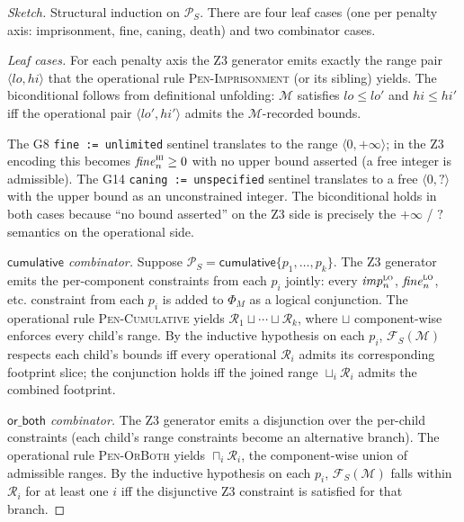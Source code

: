 \begin{proof}[Sketch]
Structural induction on $\mathcal{P}_S$. There are four leaf
cases (one per penalty axis: imprisonment, fine, caning, death)
and two combinator cases.

\textit{Leaf cases.} For each penalty axis the Z3 generator
emits exactly the range pair $\langle \mathit{lo},
\mathit{hi} \rangle$ that the operational rule
\textsc{Pen-Imprisonment} (or its sibling) yields. The
biconditional follows from definitional unfolding: $\mathcal{M}$
satisfies $\mathit{lo} \le \mathit{lo}'$ and
$\mathit{hi} \le \mathit{hi}'$ iff the operational pair
$\langle \mathit{lo}', \mathit{hi}' \rangle$ admits the
$\mathcal{M}$-recorded bounds.

The G8 \texttt{fine := unlimited} sentinel translates to the
range $\langle 0, +\infty \rangle$; in the Z3 encoding this
becomes $\mathit{fine}^{\textsc{hi}}_n \ge 0$ with no upper
bound asserted (a free integer is admissible). The G14
\texttt{caning := unspecified} sentinel translates to a free
$\langle 0, ? \rangle$ with the upper bound as an unconstrained
integer. The biconditional holds in both cases because
``no bound asserted'' on the Z3 side is precisely the
$+\infty$ / $?$ semantics on the operational side.

\textit{$\textsf{cumulative}$ combinator.} Suppose
$\mathcal{P}_S = \textsf{cumulative}\{p_1, \ldots, p_k\}$.
The Z3 generator emits the per-component constraints from each
$p_i$ jointly: every $\mathit{imp}^{\textsc{lo}}_n$,
$\mathit{fine}^{\textsc{lo}}_n$, etc. constraint from each
$p_i$ is added to $\Phi_M$ as a logical conjunction. The
operational rule \textsc{Pen-Cumulative} yields
$\mathcal{R}_1 \sqcup \cdots \sqcup \mathcal{R}_k$, where
$\sqcup$ component-wise enforces every child's range. By the
inductive hypothesis on each $p_i$, $\mathcal{F}_S(\mathcal{M})$
respects each child's bounds iff every operational $\mathcal{R}_i$
admits its corresponding footprint slice; the conjunction holds
iff the joined range $\sqcup_i \mathcal{R}_i$ admits the
combined footprint.

\textit{$\textsf{or\_both}$ combinator.} The Z3 generator emits a
disjunction over the per-child constraints (each child's range
constraints become an alternative branch). The operational rule
\textsc{Pen-OrBoth} yields $\sqcap_i \mathcal{R}_i$, the
component-wise union of admissible ranges. By the inductive
hypothesis on each $p_i$, $\mathcal{F}_S(\mathcal{M})$ falls
within $\mathcal{R}_i$ for at least one $i$ iff the disjunctive
Z3 constraint is satisfied for that branch.
\end{proof}


